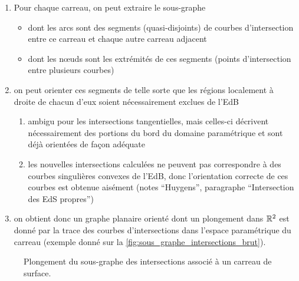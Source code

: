 \par\bigskip

\begin{enumerate}
	\item Pour chaque carreau, on peut extraire le sous-graphe 
	\begin{itemize}
		\item dont les arcs sont des segments (quasi-disjoints) de courbes d'intersection entre ce carreau et chaque autre carreau adjacent
		\item dont les n\oe uds sont les extrémités de ces segments (points d'intersection entre plusieurs courbes)
	\end{itemize}
	\item on peut orienter ces segments de telle sorte que les régions localement à droite de chacun d'eux soient nécessairement exclues de l'EdB
	\begin{enumerate}
		\item ambigu pour les intersections tangentielles, mais celles-ci décrivent nécessairement des portions du bord du domaine paramétrique et sont déjà orientées de façon adéquate
		\item les nouvelles intersections calculées ne peuvent pas correspondre à des courbes singulières convexes de l'EdB, donc l'orientation correcte de ces courbes est obtenue aisément (\cf notes ``Huygens'', paragraphe ``Intersection des EdS propres'')
	\end{enumerate}
	\item on obtient donc un graphe planaire orienté dont un plongement dans $\mathbb{R}^2$ est donné par la trace des courbes d'intersections dans l'espace paramétrique du carreau (exemple donné sur la \autoref{fig:sous_graphe_intersections_brut}).
\end{enumerate}

\begin{figure}
	\centering
	\caption{Plongement du sous-graphe des intersections associé à un carreau de surface.}
	\label{fig:sous_graphe_intersections_brut}
\end{figure}


